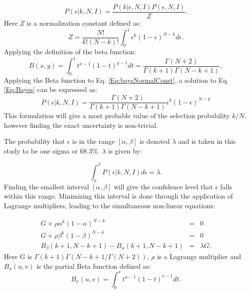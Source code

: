 \begin{equation}
P(\epsilon|k,N,I) = \frac{P(k|\epsilon,N,I) P(\epsilon,N,I)}{Z}.
\label{Eq:Bayes}
\end{equation}
Here $Z$ is a normalization constant defined as:
\begin{equation}
Z = \frac{N!}{k!(N-k)!} \int_{0}^{1}\epsilon^k (1-\epsilon)^{N-k} d \epsilon.
\label{Eq:baysNormalConst}
\end{equation}
Applying the definition of the beta function:
\begin{equation}
B(x,y) = \int_{0}^{1}t^{x-1} (1-t)^{y-1} dt = \frac{\Gamma(N+2)}{\Gamma(k+1) \Gamma(N-k+1)},
\label{Eq:betaFunc}
\end{equation}
Applying the Beta function to Eq. \eqref{Eq:baysNormalConst}, a solution to Eq. \eqref{Eq:Bayes} can be expressed as:
\begin{equation}
P(\epsilon|k,N,I) = \frac{\Gamma(N+2)}{\Gamma(k+1)\Gamma(N-k+1)} \epsilon^k (1-\epsilon)^{N-k}
\label{Eq:BayesWithBeta}
\end{equation}
This formulation will give a most probable value of the selection probability $k/N$, however finding the exact uncertainty is non-trivial.

The probability that $\epsilon$ is in the range $[\alpha, \beta]$ is denoted $\lambda$ and is taken in this study to be one sigma or 68.3$\%$. $\lambda$ is given by:

\begin{equation}
\int_{\alpha}^{\beta}P(\epsilon|k,N,I)d \epsilon = \lambda.
\label{Eq:lambdaEqn}
\end{equation}
Finding the smallest interval $[\alpha, \beta]$ will give the confidence level that $\epsilon$ falls within this range. Minimizing this interval is done through the application of Lagrange multipliers, leading to the simultaneous non-linear equations:

\begin{eqnarray}
G + \rho \alpha^k (1-\alpha)^{N-k} &=& 0\\
G + \rho \beta^k (1-\beta)^{N-k} &=& 0\\
B_{\beta}(k+1,N-k+1) - B_{\alpha}(k+1, N-k+1) &=& \lambda G.
\label{Eq:lagrangeEqns}
\end{eqnarray}
Here G is $\Gamma(k+1)\Gamma(N-k+1/\Gamma(N+2))$, $\rho$ is a Lagrange multiplier and $B_x(u,v)$ is the partial Beta function defined as:
\begin{equation}
B_x(u,v) = \int_{0}^{x}t^{u-1}(1-t)^{v-1}dt.
\label{Eq:partialBeta}
\end{equation}

